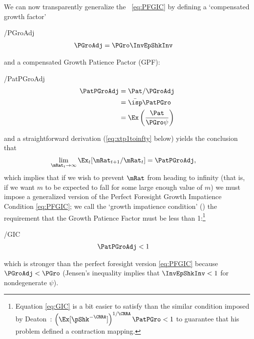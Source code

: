 \documentclass[BufferStockTheory]{subfiles}
\begin{document}
\hypertarget{GIC}{}
\hypertarget{GICI}{}
We can now transparently generalize the \PFGIC~\eqref{eq:PFGIC} by defining a `compensated growth factor' \hypertarget{PGroAdj}{}
\begin{verbatimwrite}{\EqDir/PGroAdj}
  \begin{equation}\begin{gathered}\begin{aligned}
    \PGroAdj  & =  \PGro \InvEpShkInv \label{eq:PGroAdj}
  \end{aligned}\end{gathered}\end{equation}
\end{verbatimwrite}

and a compensated Growth Patience Pactor (GPF):\hypertarget{GIF}{}
\begin{verbatimwrite}{\EqDir/PatPGroAdj}
  \begin{equation}\begin{gathered}\begin{aligned}
    \PatPGroAdj  & = \Pat/\PGroAdj \label{eq;GPF}
    \\ & = \bar{\isp}\PatPGro  \notag %
    \\ & = \Ex\left(\frac{\Pat}{\PGro \psi}\right) \notag
  \end{aligned}\end{gathered}\end{equation}
\end{verbatimwrite}

and a straightforward derivation (\eqref{eq:xtp1toinfty} below) yields the conclusion that
\begin{align*}
  \lim_{\mRat_{t} \rightarrow \infty} \Ex_{t}[\mRat_{t+1}/\mRat_{t}]  & = \PatPGroAdj,
\end{align*}
which implies that if we wish to prevent $\mRat$ from heading to infinity (that is, if we want $m$ to be expected to fall for some large enough value of $m$) we must impose a generalized version of the Perfect Foresight Growth Impatience Condition \eqref{eq:PFGIC}; we call the `growth impatience condition' (\GIC) the requirement that the Growth Patience Factor must be less than 1:\footnote{Equation \eqref{eq:GIC} is a bit easier to satisfy than the similar condition imposed by Deaton~\citeyearpar{deatonLiqConstr}: $\left(\Ex[\pShk^{-\CRRA}]\right)^{1/\CRRA} \PatPGro < 1$ to guarantee that his problem defined a contraction mapping.}  
\begin{verbatimwrite}{\EqDir/GIC}
  \begin{equation}\begin{gathered}\begin{aligned}
    \PatPGroAdj  & < 1 \label{eq:GIC}
  \end{aligned}\end{gathered}\end{equation}\end{verbatimwrite}

which is stronger than the perfect foresight version \eqref{eq:PFGIC} because $\PGroAdj < \PGro$ (Jensen's inequality implies that $\InvEpShkInv < 1$ for nondegenerate $\psi$).
\end{document}
